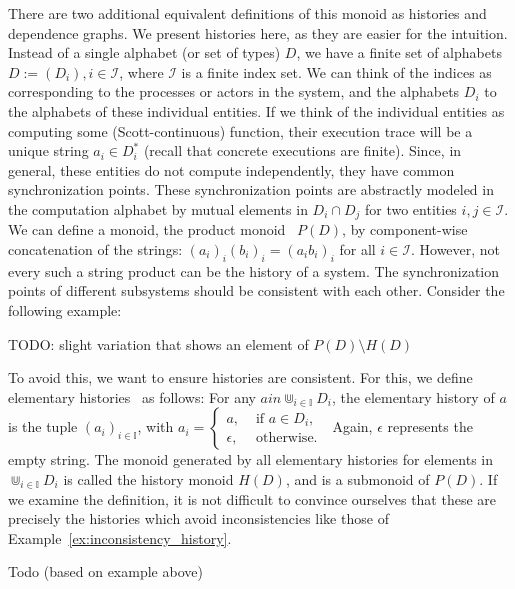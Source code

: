 There are two additional equivalent definitions of this monoid as histories and dependence graphs.
We present histories here, as they are easier for the intuition.
Instead of a single alphabet (or set of types) $D$, we have a finite set of alphabets $D := (D_i), i \in \mathcal{I}$, where $\mathcal{I}$ is a finite index set.
We can think of the indices as corresponding to the processes or actors in the system, and the alphabets $D_i$ to the alphabets of these individual entities.
If we think of the individual entities as computing some (Scott-continuous) function, their execution trace will be a unique string $a_i \in D_i^*$ (recall that concrete executions are finite).
Since, in general, these entities do not compute independently, they have common synchronization points.
These synchronization points are abstractly modeled in the computation alphabet by mutual elements in $D_i \cap D_j$ for two entities $i,j \in \mathcal{I}$.
We can define a monoid, the product monoid~ $P(D)$, by component-wise concatenation of the strings: $(a_i)_i (b_i)_i = (a_ib_i)_i$ for all $i \in \mathcal{I}$.
However, not every such a string product can be the history of a system.
The synchronization points of different subsystems should be consistent with each other. Consider the following example:
\begin{ex}
  \label{ex:inconsistency_history}
TODO: slight variation that shows an element of $P(D) \setminus H(D)$
\end{ex}
To avoid this, we want to ensure histories are consistent. For this, we define elementary histories~ as follows:
For any $a in \Cup_{i \in \mathbb{I}} D_i$, the elementary history of $a$ is the tuple $(a_i)_{i \in \mathbb{I}}$, with $a_i = \left\{ \begin{array}{ll} a, & \text{ if } a \in D_i, \\ \epsilon, & \text{ otherwise. }\end{array}\right.$
Again, $\epsilon$ represents the empty string.
The monoid generated by all elementary histories for elements in $\Cup_{i \in \mathbb{I}} D_i$ is called the history monoid $H(D)$, and is a submonoid of $P(D)$.
If we examine the definition, it is not difficult to convince ourselves that these are precisely the histories which avoid inconsistencies like those of Example~\ref{ex:inconsistency_history}.

\begin{ex}
  Todo (based on example above)
\end{ex}

